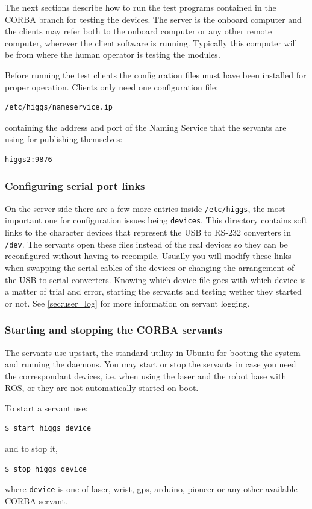 The next sections describe how to run the test programs contained in the CORBA branch for testing the devices.
The server is the onboard computer and the clients may refer both to the onboard computer or any other remote computer,
wherever the client software is running. Typically this computer will be from where the human operator is testing the modules.

Before running the test clients the configuration files must have been installed for proper operation.
Clients only need one configuration file:
\begin{verbatim}
/etc/higgs/nameservice.ip
\end{verbatim}
containing the address and port of the Naming Service that the servants are using for publishing themselves:
\begin{verbatim}
higgs2:9876
\end{verbatim}

\subsubsection{Configuring serial port links}
\label{sec:serial_links}

On the server side there are a few more entries inside \texttt{/etc/higgs}, the most important one for configuration issues being \texttt{devices}. This directory contains soft links to the character devices that represent the USB to RS-232 converters in \texttt{/dev}. The servants open these files instead of the real devices so they can be reconfigured without having to recompile. Usually you will modify these links when swapping the serial cables of the devices or changing the arrangement of the USB to serial converters. Knowing which device file goes with which device is a matter of trial and error, starting the servants and testing wether they started or not. See \ref{sec:user_log} for more information on servant logging.


\subsubsection{Starting and stopping the CORBA servants}
The servants use upstart, the standard utility in Ubuntu for booting the system and running the daemons.
You may start or stop the servants in case you need the correspondant devices, i.e. when using the laser and the robot base with ROS, or they are not automatically started on boot.

To start a servant use:
\begin{verbatim}
$ start higgs_device
\end{verbatim}
and to stop it,
\begin{verbatim}
$ stop higgs_device
\end{verbatim}
where \verb"device" is one of laser, wrist, gps, arduino, pioneer or any other available CORBA servant.


